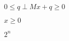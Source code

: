 \documentclass{article}
\begin{document}
$0\leq q \perp Mx+q \geq 0 $
\pagebreak

$x\geq0$
\pagebreak

$2^n$
\pagebreak
\end{document}
